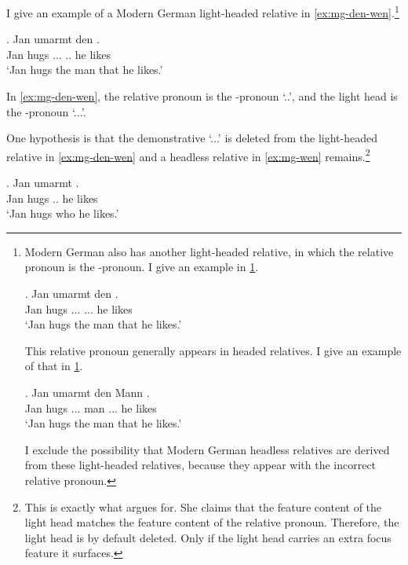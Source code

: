 I give an example of a Modern German light-headed relative in \ref{ex:mg-den-wen}.\footnote{
Modern German also has another light-headed relative, in which the relative pronoun is the -pronoun. I give an example in \ref{ex:mg-den-den}.

\exg. Jan umarmt den   .\\
Jan hugs ... ... he likes\\
`Jan hugs the man that he likes.'\label{ex:mg-den-den}

This relative pronoun generally appears in headed relatives. I give an example of that in \ref{ex:mg-den-headed}.

\exg. Jan umarmt den Mann   .\\
Jan hugs ... man ... he likes\\
`Jan hugs the man that he likes.'\label{ex:mg-den-headed}

I exclude the possibility that Modern German headless relatives are derived from these light-headed relatives, because they appear with the incorrect relative pronoun.
}

\exg. Jan umarmt den   .\\
Jan hugs ... .. he likes\\
`Jan hugs the man that he likes.'\label{ex:mg-den-wen}

In \ref{ex:mg-den-wen}, the relative pronoun is the -pronoun  `..', and the light head is the -pronoun  `...'.

One hypothesis is that the demonstrative  `...' is deleted from the light-headed relative in \ref{ex:mg-den-wen} and a headless relative in \ref{ex:mg-wen} remains.\footnote{
This is exactly what \citet{hanink2018} argues for. She claims that the feature content of the light head matches the feature content of the relative pronoun. Therefore, the light head is by default deleted. Only if the light head carries an extra focus feature it surfaces.
}

\exg. Jan umarmt   .\\
Jan hugs .. he likes\\
`Jan hugs who he likes.'\label{ex:mg-wen}

